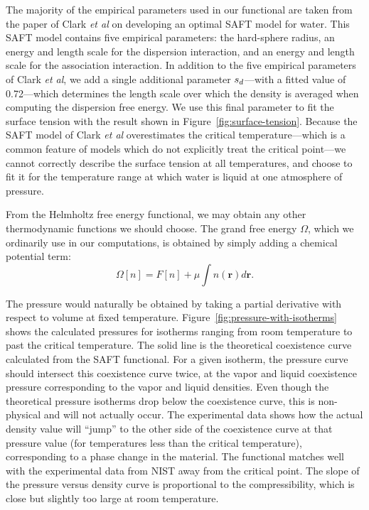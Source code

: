 \documentclass[letterpaper,twocolumn,amsmath,amssymb,prb]{revtex4-1}
\newcommand{\xx}{\textbf{r}}
\begin{document}
The majority of the empirical parameters used in our functional are
taken from the paper of Clark \emph{et al} on developing an optimal
SAFT model for water\cite{clark2006developing}.  This SAFT model
contains five empirical parameters: the hard-sphere radius, an energy
and length scale for the dispersion interaction, and an energy and
length scale for the association interaction.  In addition to the five
empirical parameters of Clark \emph{et al}, we add a single additional
parameter $s_d$---with a fitted value of 0.72---which determines
the length scale over which the density is averaged when computing the
dispersion free energy.  We use this final parameter to fit the
surface tension with the result shown in
Figure~\ref{fig:surface-tension}.  Because the SAFT model of Clark
\emph{et al} overestimates the critical temperature---which is a
common feature of models which do not explicitly treat the critical
point---we cannot correctly describe the surface tension at all
temperatures, and choose to fit it for the temperature range at which
water is liquid at one atmosphere of pressure.

From the Helmholtz free energy functional, we may obtain any other
thermodynamic functions we should choose.  The grand free energy
$\Omega$, which we ordinarily use in our computations, is obtained by
simply adding a chemical potential term:
\begin{equation}
  \Omega[n] = F[n] + \mu \int n(\xx) d\xx.
\end{equation}

The pressure would naturally be obtained by taking a partial
derivative with respect to volume at fixed temperature. 
Figure~\ref{fig:pressure-with-isotherms} shows the calculated pressures for
isotherms ranging from room temperature to past the critical temperature. The
solid line is the theoretical coexistence curve calculated from the SAFT
functional. For a given isotherm, the pressure curve should intersect this
coexistence curve twice, at the vapor and liquid coexistence 
pressure corresponding to the vapor and liquid densities. Even
though the theoretical pressure isotherms drop below the coexistence curve,
this is non-physical and will not actually occur. The experimental data shows
how the actual density value will ``jump'' to the other side of 
the coexistence curve at that pressure value (for
temperatures less than the critical temperature), corresponding to a phase 
change in the material. The
functional matches well with the experimental data from NIST away from the
critical point. The slope of the pressure versus density curve is proportional
to the compressibility, which is close but slightly too large at room
temperature. 
\end{document}
